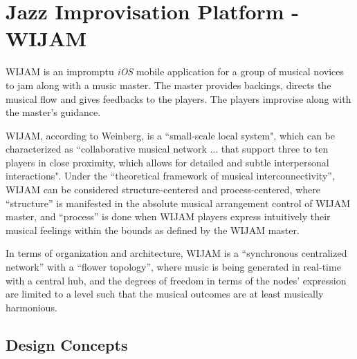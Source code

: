 \section{Jazz Improvisation Platform - WIJAM} \label{sec:5-wijam}
WIJAM is an impromptu \textit{iOS} mobile application for a group of musical novices to jam along with a music master. The master provides backings, directs the musical flow and gives feedbacks to the players. The players improvise along with the master's guidance.

WIJAM, according to Weinberg\cite{weinberg2005interconnected}, is a ``small-scale local system", which can be characterized as ``collaborative musical network ... that support three to ten players in close proximity, which allows for detailed and subtle interpersonal interactions". Under the ``theoretical framework of musical interconnectivity''\cite{weinberg2005interconnected}, WIJAM can be considered structure-centered and process-centered, where ``structure'' is manifested in the absolute musical arrangement control of WIJAM master, and ``process'' is done when WIJAM players express intuitively their musical feelings within the bounds as defined by the WIJAM master.

In terms of organization and architecture, WIJAM is a ``synchronous centralized network''
with a ``flower topology'', where music is being generated in real-time
with a central hub, and the degrees of freedom in terms of the nodes'
expression are limited to a level such that the musical outcomes are at
least musically harmonious.

\subsection{Design Concepts}

